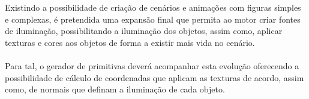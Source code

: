 \noindent
Existindo a possibilidade de criação de cenários e animações
com figuras simples e complexas, é pretendida uma expansão final
que permita ao motor criar fontes de iluminação, possibilitando
a iluminação dos objetos, assim como, aplicar texturas e cores
aos objetos de forma a existir mais vida no cenário.\\
\\
Para tal, o gerador de primitivas deverá acompanhar esta evolução
oferecendo a possibilidade de cálculo de coordenadas que
aplicam as texturas de acordo, assim como, de normais que
definam a iluminação de cada objeto.